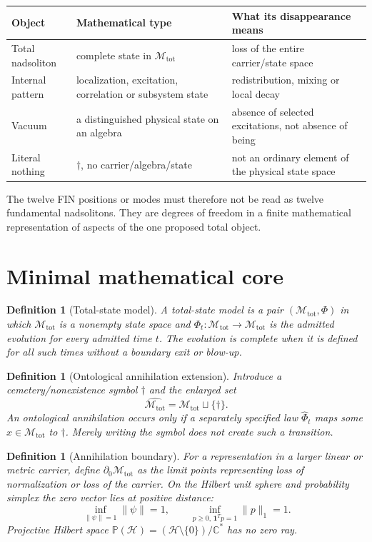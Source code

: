 \documentclass[11pt,a4paper]{article}
\newtheorem{definition}[theorem]{Definition}
\newcommand{\Mtot}{\mathcal M_{\mathrm{tot}}}
\newcommand{\nothingstate}{\dagger}
\begin{document}
\begin{longtable}{@{}p{}p{}p{}@{}}
\toprule
Object & Mathematical type & What its disappearance means \\
\midrule\endhead
Total nadsoliton & complete state in $\Mtot$ & loss of the entire carrier/state space \\
Internal pattern & localization, excitation, correlation or subsystem state & redistribution, mixing or local decay \\
Vacuum & a distinguished physical state on an algebra & absence of selected excitations, not absence of being \\
Literal nothing & $\nothingstate$, no carrier/algebra/state & not an ordinary element of the physical state space \\
\bottomrule
\end{longtable}

The twelve FIN positions or modes must therefore not be read as twelve
fundamental nadsolitons.  They are degrees of freedom in a finite mathematical
representation of aspects of the one proposed total object.

\section{Minimal mathematical core}

\begin{definition}[Total-state model]
A total-state model is a pair $(\Mtot,\Phi)$ in which $\Mtot$ is a nonempty
state space and $\Phi_t:\Mtot\to\Mtot$ is the admitted evolution for every
admitted time $t$.  The evolution is \emph{complete} when it is defined for
all such times without a boundary exit or blow-up.
\end{definition}

\begin{definition}[Ontological annihilation extension]
Introduce a cemetery/nonexistence symbol $\nothingstate$ and the enlarged set
\[
  \widehat{\Mtot}=\Mtot\sqcup\{\nothingstate\}.
\]
An ontological annihilation occurs only if a separately specified law
$\widehat\Phi_t$ maps some $x\in\Mtot$ to $\nothingstate$.  Merely writing the
symbol does not create such a transition.
\end{definition}

\begin{definition}[Annihilation boundary]
For a representation in a larger linear or metric carrier, define
$\partial_0\Mtot$ as the limit points representing loss of normalization or
loss of the carrier.  On the Hilbert unit sphere and probability simplex the
zero vector lies at positive distance:
\[
 \inf_{\|\psi\|=1}\|\psi\|=1,
 \qquad
 \inf_{p\ge0,\,\mathbf1^Tp=1}\|p\|_1=1.
\]
Projective Hilbert space
$\mathbb P(\mathcal H)=(\mathcal H\setminus\{0\})/\mathbb C^*$ has no zero ray.
\end{definition}
\end{document}
